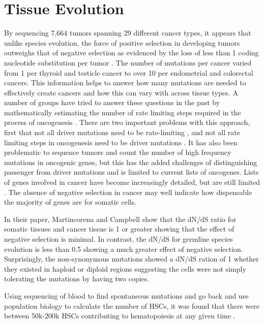 \documentclass[]{book}
\begin{document}
\hypertarget{tissue-evolution}{%
\section{Tissue Evolution}\label{tissue-evolution}}

By sequencing 7,664 tumors spanning 29 different cancer types, it appears that unlike species evolution, the force of positive selection in developing tumors outweighs that of negative selection as evidenced by the loss of less than 1 coding nucleotide substitution per tumor \citep{martincorena2017universal}. The number of mutations per cancer varied from 1 per thyroid and testicle cancer to over 10 per endometrial and colorectal cancers. This information helps to answer how many mutations are needed to effectively create cancers and how this can vary with across tissue types. A number of groups have tried to answer these questions in the past by mathematically estimating the number of rate limiting steps required in the process of oncogenesis \citep{armitage1954age, tomasetti2015variation}. There are two important problems with this approach, first that not all driver mutations need to be rate-limiting \citep{yates2015subclonal}, and not all rate limiting steps in oncogenesis need to be driver mutations \citep{martincorena2015high}. It has also been problematic to sequence tumors and count the number of high frequency mutations in oncogenic genes, but this has the added challenges of distinguishing passenger from driver mutations and is limited to current lists of oncogenes. Lists of genes involved in cancer have become increasingly detailed, but are still limited \citep{lawrence2014discovery, kandoth2013mutational}. The absence of negative selection in cancer may well indicate how dispensable the majority of genes are for somatic cells.

In their paper, Martincorena and Campbell show that the dN/dS ratio for somatic tissues and cancer tissue is 1 or greater showing that the effect of negative selection is minimal. In contrast, the dN/dS for germline species evolution is less than 0.5 showing a much greater effect of negative selection. Surprisingly, the non-synonymous mutations showed a dN/dS ration of 1 whether they existed in haploid or diploid regions suggesting the cells were not simply tolerating the mutations by having two copies.

Using sequencing of blood to find spontaneous mutations and go back and use population biology to calculate the number of HSCs, it was found that there were between 50k-200k HSCs contributing to hematopoiesis at any given time \citep{lee2018population}.
\end{document}

